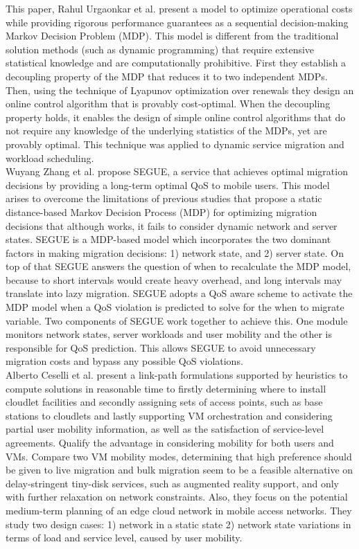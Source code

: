 \cite{urgaonkar2015dynamic}
This paper, Rahul Urgaonkar et al. present a model to optimize operational costs while providing rigorous performance guarantees as a sequential decision-making Markov Decision Problem (MDP). This model is different from the traditional solution methods (such as dynamic programming) that require extensive statistical knowledge and are computationally prohibitive. First they establish a decoupling property of the MDP that reduces it to two independent MDPs. Then, using the technique of Lyapunov optimization over renewals they design an online control algorithm that is provably cost-optimal. When the decoupling property holds, it enables the design of simple online control algorithms that do not require any knowledge of the underlying statistics of the MDPs, yet are provably optimal. This technique was applied to dynamic service migration and workload scheduling.\\

\cite{zhang2016segue}
Wuyang Zhang et al. propose SEGUE, a service that achieves optimal migration decisions by providing a long-term optimal QoS to mobile users. This model arises to overcome the limitations of previous studies that propose a static distance-based Markov Decision Process (MDP) for optimizing migration decisions that although works, it fails to consider dynamic network and server states. SEGUE is a MDP-based model which incorporates the two dominant factors in making migration decisions: 1) network state, and 2) server state. On top of that SEGUE answers the question of when to recalculate the MDP model, because to short intervals would create heavy overhead, and long intervals may translate into lazy migration. SEGUE adopts a QoS aware scheme to activate the MDP model when a QoS violation is predicted to solve for the when to migrate variable. Two components of SEGUE work together to achieve this. One module monitors network states, server workloads and user mobility and the other is responsible for QoS prediction. This allows SEGUE to avoid unnecessary migration costs and bypass any possible QoS violations.\\

\cite{ceselli2017mobile}
Alberto Ceselli et al. present a link-path formulations supported by heuristics to compute solutions in reasonable time to firstly determining where to install cloudlet facilities and secondly assigning sets of access points, such as base stations to cloudlets and lastly supporting VM orchestration and considering partial user mobility information, as well as the satisfaction of service-level agreements. Qualify the advantage in considering mobility for both users and VMs. Compare two VM mobility modes, determining that high preference should be given to live migration and bulk migration seem to be a feasible alternative on delay-stringent tiny-disk services, such as augmented reality support, and only with further relaxation on network constraints. Also, they focus on the potential medium-term planning of an edge cloud network in mobile access networks. They study two design cases: 1) network in a static state 2) network state variations in terms of load and service level, caused by user mobility.\\

